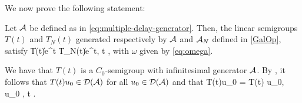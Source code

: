 We now prove the following statement:

\bprop
Let  \(\mathcal A\) be defined as in \cref{eq:multiple-delay-generator}. Then, the linear semigroups $T(t)$ and $T_N(t)$ generated respectively by \(\mathcal A\) and \(\mathcal A_N\)  defined in \eqref{GalOp},  satisfy 
\be\label{stable_estimates}
    \|T(t)\| \le e^{\omega t} \quad {}  \quad \|T_N(t)\| \le e^{\omega t}, \qquad t ,
\ee
with \(\omega\) given by \cref{eq:omega}.
\eprop

\bp
We have that \(T(t)\) is a \(C_0\)-semigroup with infinitesimal generator \(\mathcal A\). By \cite[Thm. 2.4 c) p.5]{P83}, it follows that \(T(t)u_0\in \mathcal D(\mathcal A)\) for all \(u_0\in\mathcal D(\mathcal A)\) and that 
\be
     T(t)u_0 =  T(t) u_0,   \qquad \Forall u_0 \in {}, \; t .
\ee

